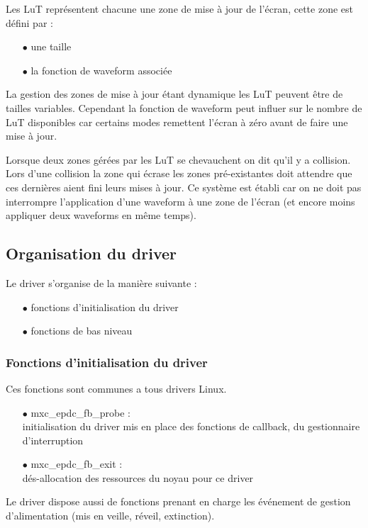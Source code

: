 Les LuT représentent chacune une zone de mise à jour de l'écran, cette zone est défini par : 
	\begin{itemize}
		\item[$\bullet$] une taille
		\item[$\bullet$] la fonction de waveform associée
	\end{itemize}
La gestion des zones de mise à jour étant dynamique les LuT peuvent être de tailles variables. Cependant la fonction de waveform peut influer sur le nombre de LuT disponibles car certains modes remettent l'écran à zéro avant de faire une mise à jour.

Lorsque deux zones gérées par les LuT se chevauchent on dit qu'il y a collision. Lors d'une collision 
la zone qui écrase les zones pré-existantes doit attendre que ces dernières aient fini leurs mises à jour. Ce système est établi car on ne doit pas interrompre l'application d'une waveform à une zone de l'écran (et encore moins appliquer deux waveforms en même temps).
\subsection{Organisation du driver}

Le driver s'organise de la manière suivante : 
	\begin{itemize}
		\item[$\bullet$] fonctions d'initialisation du driver
		\item[$\bullet$] fonctions de bas niveau
	\end{itemize}
	
\subsubsection{Fonctions d'initialisation du driver} %

	Ces fonctions sont communes a tous drivers Linux.
	\begin{itemize}
		\item[$\bullet$] mxc\_epdc\_fb\_probe : \\
		initialisation du driver mis en place des fonctions de callback, du gestionnaire d'interruption
		\item[$\bullet$] mxc\_epdc\_fb\_exit :\\
		dés-allocation des ressources du noyau pour ce driver
	\end{itemize}
	Le driver dispose aussi de fonctions prenant en charge les événement de gestion d'alimentation (mis en veille, réveil, extinction).
	
